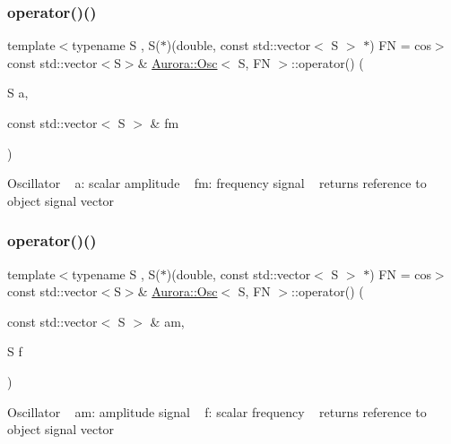 \subsubsection{\texorpdfstring{operator()()}{operator()()}\hspace{0.1cm}{\footnotesize\ttfamily [2/6]}}
{\footnotesize\ttfamily template$<$typename S , S($\ast$)(double, const std\+::vector$<$ S $>$ $\ast$) FN = cos$>$ \\
const std\+::vector$<$S$>$\& \hyperlink{class_aurora_1_1_osc}{Aurora\+::\+Osc}$<$ S, FN $>$\+::operator() (\begin{DoxyParamCaption}\item[{S}]{a,  }\item[{const std\+::vector$<$ S $>$ \&}]{fm }\end{DoxyParamCaption})\hspace{0.3cm}{\ttfamily [inline]}}

Oscillator ~\newline
a\+: scalar amplitude ~\newline
fm\+: frequency signal ~\newline
returns reference to object signal vector \mbox{\label{class_aurora_1_1_osc_af0e68ce0f58f3cf4bf49d20f1a1e5e81}} 
\subsubsection{\texorpdfstring{operator()()}{operator()()}\hspace{0.1cm}{\footnotesize\ttfamily [3/6]}}
{\footnotesize\ttfamily template$<$typename S , S($\ast$)(double, const std\+::vector$<$ S $>$ $\ast$) FN = cos$>$ \\
const std\+::vector$<$S$>$\& \hyperlink{class_aurora_1_1_osc}{Aurora\+::\+Osc}$<$ S, FN $>$\+::operator() (\begin{DoxyParamCaption}\item[{const std\+::vector$<$ S $>$ \&}]{am,  }\item[{S}]{f }\end{DoxyParamCaption})\hspace{0.3cm}{\ttfamily [inline]}}

Oscillator ~\newline
am\+: amplitude signal ~\newline
f\+: scalar frequency ~\newline
returns reference to object signal vector \mbox{\label{class_aurora_1_1_osc_a5f0d9cf3393f173b810b7049ea2807ac}} 

